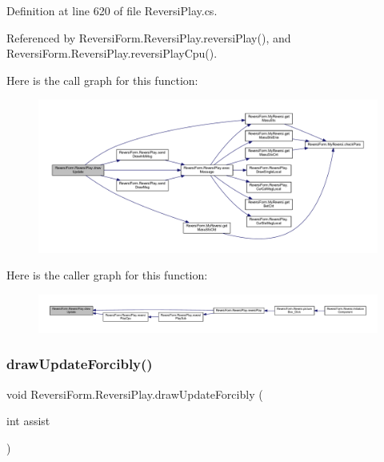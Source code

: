 Definition at line 620 of file Reversi\+Play.\+cs.



Referenced by Reversi\+Form.\+Reversi\+Play.\+reversi\+Play(), and Reversi\+Form.\+Reversi\+Play.\+reversi\+Play\+Cpu().

Here is the call graph for this function\+:\nopagebreak
\begin{figure}[H]
\begin{center}
\leavevmode
\includegraphics[width=350pt]{class_reversi_form_1_1_reversi_play_af1415f15759ba8475b4b5afca3a35017_cgraph}
\end{center}
\end{figure}
Here is the caller graph for this function\+:\nopagebreak
\begin{figure}[H]
\begin{center}
\leavevmode
\includegraphics[width=350pt]{class_reversi_form_1_1_reversi_play_af1415f15759ba8475b4b5afca3a35017_icgraph}
\end{center}
\end{figure}
\mbox{\label{class_reversi_form_1_1_reversi_play_accc1d553ba6a6c2a5f0c58316b40a183}} 
\subsubsection{\texorpdfstring{draw\+Update\+Forcibly()}{drawUpdateForcibly()}}
{\footnotesize\ttfamily void Reversi\+Form.\+Reversi\+Play.\+draw\+Update\+Forcibly (\begin{DoxyParamCaption}\item[{int}]{assist }\end{DoxyParamCaption})}



